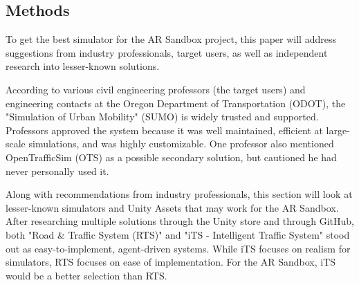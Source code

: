 \documentclass[IEEEtran]{article}
\begin{document}
\subsection{Methods}
\par To get the best simulator for the AR Sandbox project, this paper will address suggestions from industry professionals, target users, as well as independent research into lesser-known solutions. 
\par According to various civil engineering professors (the target users) and engineering contacts at the Oregon Department of Transportation (ODOT), the "Simulation of Urban Mobility" (SUMO) is widely trusted and supported. Professors approved the system because it was well maintained, efficient at large-scale simulations, and was highly customizable. One professor also mentioned OpenTrafficSim (OTS) as a possible secondary solution, but cautioned he had never personally used it. 
\par Along with recommendations from industry professionals, this section will look at 
lesser-known simulators and Unity Assets that may work for the AR Sandbox. After researching multiple solutions through the Unity store and through GitHub, both "Road \& Traffic System (RTS)" and "iTS - Intelligent Traffic System" stood out as easy-to-implement, agent-driven systems. While iTS focuses on realism for simulators, RTS focuses on ease of implementation. For the AR Sandbox, iTS would be a better selection than RTS. 
\end{document}
